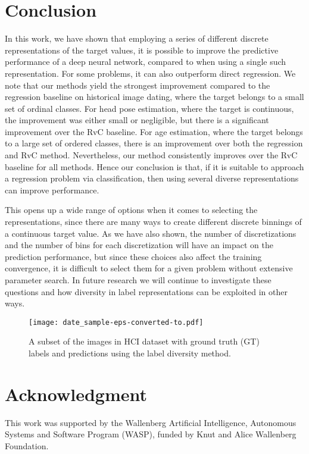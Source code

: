 \documentclass[10pt, conference, a4paper]{IEEEtran}
\begin{document}
\section{Conclusion}
In this work, we have shown that employing a series of different discrete representations of the target values, it is possible to improve the predictive performance of a deep neural network, compared to when using a single such representation. For some problems, it can also outperform direct regression. We note that our methods yield the strongest improvement compared to the regression baseline on historical image dating, where the target belongs to a small set of ordinal classes. For head pose estimation, where the target is continuous, the improvement was either small or negligible, but there is a significant improvement over the RvC baseline. For age estimation, where the target belongs to a large set of ordered classes, there is an improvement over both the regression and RvC method. Nevertheless, our method consistently improves over the RvC baseline for all methods. Hence our conclusion is that, if it is suitable to approach a regression problem via classification, then using several diverse representations can improve performance. 

This opens up a wide range of options when it comes to selecting the representations, since there are many ways to create different discrete binnings of a continuous target value. As we have also shown, the number of discretizations and the number of bins for each discretization will have an impact on the prediction performance, but since these choices also affect the training convergence, it is difficult to select them for a given problem without extensive parameter search. In future research we will continue to investigate these questions and how diversity in label representations can be exploited in other ways.

\begin{figure}[t]
  \centering
  \texttt{[image: date\_sample-eps-converted-to.pdf]}
  \caption{A subset of the images in HCI dataset \cite{DBLP:conf/eccv/PalermoHE12} with ground truth (GT) labels and predictions using the label diversity method.}
\label{hci_preview}
\end{figure}



\section*{Acknowledgment}
This work was supported by the Wallenberg Artificial Intelligence, Autonomous Systems and Software Program (WASP), funded by Knut and Alice Wallenberg Foundation.










\end{document}
